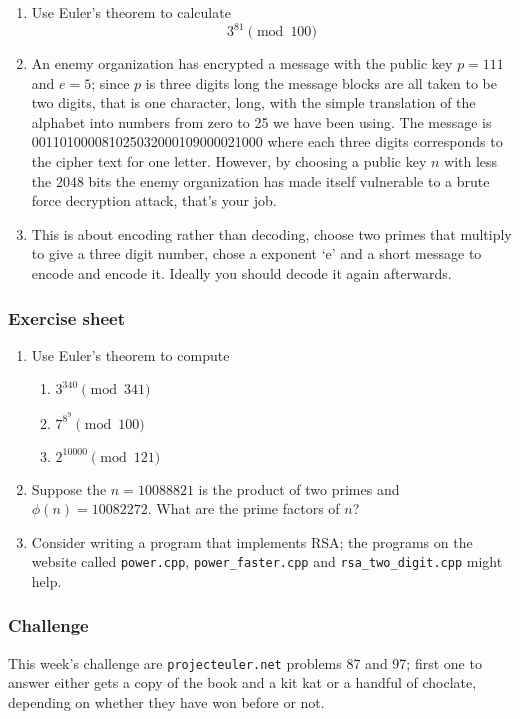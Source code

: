\documentclass[12pt]{article}
\begin{document}
\begin{enumerate}
\item Use Euler's theorem to calculate
\begin{equation}
3^{81}\pmod{100}
\end{equation}
\item An enemy organization has encrypted a message with the public
  key $p=111$ and $e=5$; since $p$ is three digits long the message
  blocks are all taken to be two digits, that is one character, long,
  with the simple translation of the alphabet into numbers from zero
  to 25 we have been using. The message is
  001101000081025032000109000021000 where each three digits
  corresponds to the cipher text for one letter. However, by choosing
  a public key $n$ with less the 2048 bits the enemy organization has
  made itself vulnerable to a brute force decryption attack, that's
  your job.
\item This is about encoding rather than decoding, choose two primes
  that multiply to give a three digit number, chose a exponent
  \lq{}e\rq{} and a short message to encode and encode it. Ideally you should decode it again afterwards.
  
\end{enumerate}


\subsubsection*{Exercise sheet}

\begin{enumerate}
\item Use Euler's theorem to compute
\begin{enumerate}
\item $3^{340}\pmod{341}$
\item $7^{8^9}\pmod{100}$
\item $2^{10000}\pmod{121}$
\end{enumerate}
\item Suppose the $n=10088821$ is the product of two primes and $\phi(n)=10082272$. What are the prime factors of $n$?
\item Consider writing a program that implements RSA; the programs on the website called \texttt{power.cpp}, \texttt{power\_faster.cpp} and \texttt{rsa\_two\_digit.cpp} might help.
\end{enumerate}
\subsubsection*{Challenge}
This week's challenge are \texttt{projecteuler.net} problems 87 and 97; first one to answer either gets a copy of the book and a kit kat or a handful of choclate, depending on whether they have won before or not.
\end{document}

